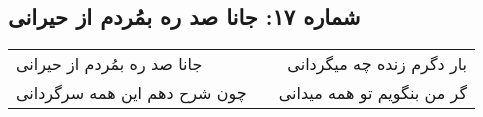 \begin{center}
\section*{شماره ۱۷: جانا صد ره بمُردم از حیرانی}
\label{sec:017}
\begin{longtable}{l p{0.5cm} r}
جانا صد ره بمُردم از حیرانی
&&
بار دگرم زنده چه میگردانی
\\
چون شرح دهم این همه سرگردانی
&&
گر من بنگویم تو همه میدانی
\\
\end{longtable}
\end{center}
